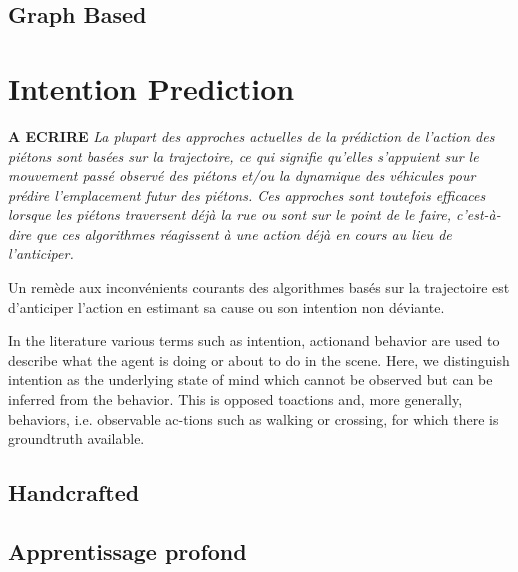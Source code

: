 \subsection{Graph Based}

\section{Intention Prediction}

\textbf{A ECRIRE}
\textit{La plupart des approches actuelles de la prédiction de l'action des piétons sont basées sur la trajectoire, ce qui signifie qu'elles s'appuient sur le mouvement passé observé des piétons et/ou la dynamique des véhicules pour prédire l'emplacement futur des piétons. Ces approches sont toutefois efficaces lorsque les piétons traversent déjà la rue ou sont sur le point de le faire, c'est-à-dire que ces algorithmes réagissent à une action déjà en cours au lieu de l'anticiper.}

Un remède aux inconvénients courants des algorithmes basés sur la trajectoire est d'anticiper l'action en estimant sa cause ou son intention non déviante.


In the literature various terms such as intention, actionand behavior are used to describe what the agent is doing or about to do in the scene. Here, we distinguish intention as the underlying state of mind which cannot be observed but can be inferred from the behavior. This is opposed toactions and, more generally, behaviors, i.e. observable ac-tions such as walking or crossing, for which there is groundtruth available.




\subsection{Handcrafted}
\subsection{Apprentissage profond}


